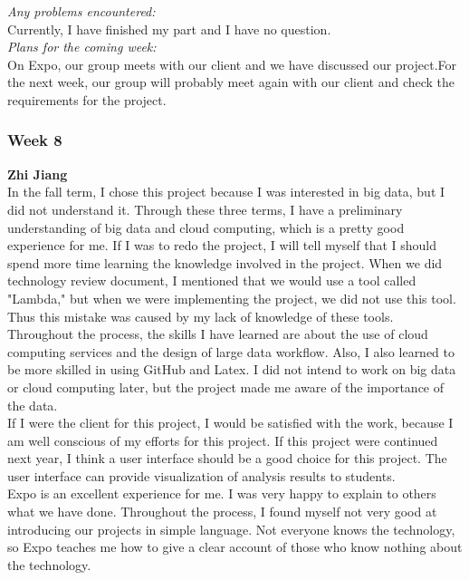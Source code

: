 \noindent\textit{Any problems encountered:}\\
Currently, I have finished my part and I have no question.\\

\noindent\textit{Plans for the coming week:}\\
On Expo, our group meets with our client and we have discussed our project.For the next week, our group will probably meet again with our client and check the requirements for the project.\\

\subsubsection{Week 8}
\textbf{Zhi Jiang}\\
In the fall term, I chose this project because I was interested in big data, but I did not understand it. Through these three terms, I have a preliminary understanding of big data and cloud computing, which is a pretty good experience for me. If I was to redo the project, I will tell myself that I should spend more time learning the knowledge involved in the project. When we did technology review document, I mentioned that we would use a tool called "Lambda," but when we were implementing the project, we did not use this tool. Thus this mistake was caused by my lack of knowledge of these tools.\\

\noindent Throughout the process, the skills I have learned are about the use of cloud computing services and the design of large data workflow. Also, I also learned to be more skilled in using GitHub and Latex. I did not intend to work on big data or cloud computing later, but the project made me aware of the importance of the data.\\

\noindent If I were the client for this project, I would be satisfied with the work, because I am well conscious of my efforts for this project. If this project were continued next year, I think a user interface should be a good choice for this project. The user interface can provide visualization of analysis results to students.\\

\noindent Expo is an excellent experience for me. I was very happy to explain to others what we have done. Throughout the process, I found myself not very good at introducing our projects in simple language. Not everyone knows the technology, so Expo teaches me how to give a clear account of those who know nothing about the technology.\\

